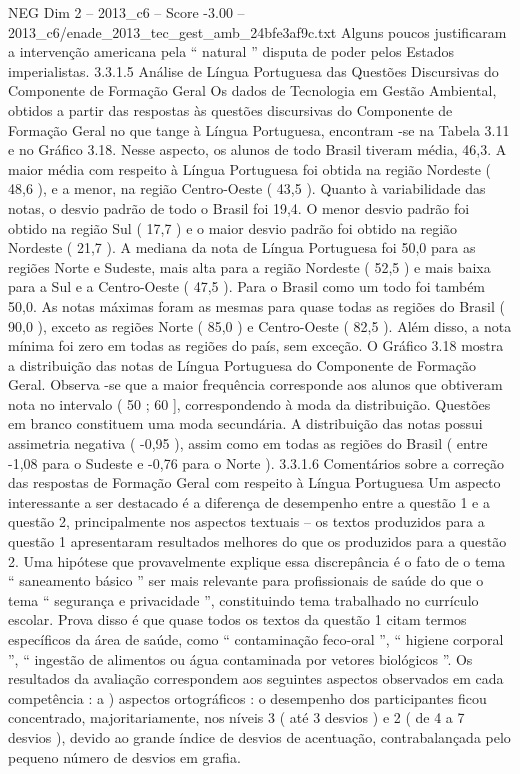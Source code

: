\begin{textsample}{NEG Dim 2 – 2013\_c6 – Score -3.00 – 2013\_c6/enade\_2013\_tec\_gest\_amb\_24bfe3af9c.txt}
Alguns poucos justificaram a intervenção americana pela “ natural ” disputa de poder pelos Estados imperialistas. 3.3.1.5 Análise de Língua Portuguesa das Questões Discursivas do Componente de Formação Geral Os dados de Tecnologia em Gestão Ambiental, obtidos a partir das respostas às questões discursivas do Componente de Formação Geral no que tange à Língua Portuguesa, encontram -se na Tabela 3.11 e no Gráfico 3.18.
Nesse aspecto, os alunos de todo Brasil tiveram média, 46,3.
A maior média com respeito à Língua Portuguesa foi obtida na região Nordeste ( 48,6 ), e a menor, na região Centro-Oeste ( 43,5 ).
Quanto à variabilidade das notas, o desvio padrão de todo o Brasil foi 19,4.
O menor desvio padrão foi obtido na região Sul ( 17,7 ) e o maior desvio padrão foi obtido na região Nordeste ( 21,7 ).
A mediana da nota de Língua Portuguesa foi 50,0 para as regiões Norte e Sudeste, mais alta para a região Nordeste ( 52,5 ) e mais baixa para a Sul e a Centro-Oeste ( 47,5 ).
Para o Brasil como um todo foi também 50,0.
As notas máximas foram as mesmas para quase todas as regiões do Brasil ( 90,0 ), exceto as regiões Norte ( 85,0 ) e Centro-Oeste ( 82,5 ).
Além disso, a nota mínima foi zero em todas as regiões do país, sem exceção.
O Gráfico 3.18 mostra a distribuição das notas de Língua Portuguesa do Componente de Formação Geral.
Observa -se que a maior frequência corresponde aos alunos que obtiveram nota no intervalo ( 50 ; 60 ], correspondendo à moda da distribuição.
Questões em branco constituem uma moda secundária.
A distribuição das notas possui assimetria negativa ( -0,95 ), assim como em todas as regiões do Brasil ( entre -1,08 para o Sudeste e -0,76 para o Norte ). 3.3.1.6 Comentários sobre a correção das respostas de Formação Geral com respeito à Língua Portuguesa Um aspecto interessante a ser destacado é a diferença de desempenho entre a questão 1 e a questão 2, principalmente nos aspectos textuais – os textos produzidos para a questão 1 apresentaram resultados melhores do que os produzidos para a questão 2.
Uma hipótese que provavelmente explique essa discrepância é o fato de o tema “ saneamento básico ” ser mais relevante para profissionais de saúde do que o tema “ segurança e privacidade ”, constituindo tema trabalhado no currículo escolar.
Prova disso é que quase todos os textos da questão 1 citam termos específicos da área de saúde, como “ contaminação feco-oral ”, “ higiene corporal ”, “ ingestão de alimentos ou água contaminada por vetores biológicos ”.
Os resultados da avaliação correspondem aos seguintes aspectos observados em cada competência : a ) aspectos ortográficos : o desempenho dos participantes ficou concentrado, majoritariamente, nos níveis 3 ( até 3 desvios ) e 2 ( de 4 a 7 desvios ), devido ao grande índice de desvios de acentuação, contrabalançada pelo pequeno número de desvios em grafia.

\end{textsample}
